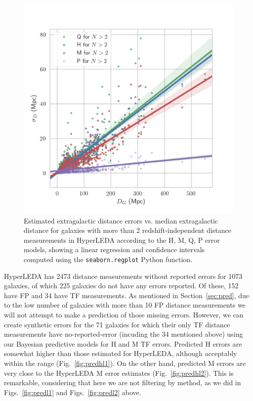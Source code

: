 \documentclass[a4paper,fleqn,usenatbib]{mnras}
\begin{document}
\begin{figure}
	\includegraphics[scale=0.7]{HLhigh.png}
    \caption{Estimated extragalactic distance errors vs. median extragalactic distance for galaxies with more than 2 redshift-independent distance measurements in HyperLEDA according to the H, M, Q, P error models, showing a linear regression and confidence intervals computed using the \texttt{seaborn.regplot} Python function.}
    \label{fig:HLhigh}
\end{figure}
HyperLEDA has 2473 distance measurements without reported errors for 1073 galaxies, of which 225 galaxies do not have any errors reported. Of these, 152 have FP and 34 have TF measurements. As mentioned in Section~\ref{sec:pred}, due to the low number of galaxies with more than 10 FP distance measurements we will not attempt to make a prediction of those missing errors. However, we can create synthetic errors for the 71 galaxies for which their only TF distance measurements have no-reported-error (incuding the 34 mentioned above) using our Bayesian predictive models for H and M TF errors. Predicted H errors are somewhat higher than those estimated for HyperLEDA, although acceptably within the range (Fig.~\ref{fig:predhl1}). On the other hand, predicted M errors are very close to the HyperLEDA M error estimates (Fig.~\ref{fig:predhl2}). This is remarkable, considering that here we are not filtering by method, as we did in Figs.~\ref{fig:predl1} and Figs.~\ref{fig:predl2} above.
\end{document}
